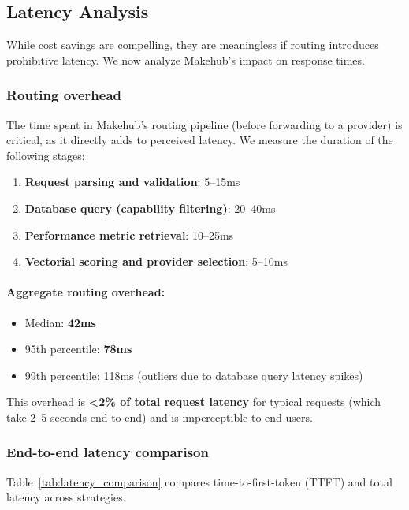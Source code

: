 \documentclass[english]{article}
\begin{document}
\subsection{Latency Analysis}

While cost savings are compelling, they are meaningless if routing introduces prohibitive latency. We now analyze Makehub's impact on response times.

\subsubsection{Routing overhead}

The time spent in Makehub's routing pipeline (before forwarding to a provider) is critical, as it directly adds to perceived latency. We measure the duration of the following stages:

\begin{enumerate}
\item \textbf{Request parsing and validation}: 5--15ms
\item \textbf{Database query (capability filtering)}: 20--40ms
\item \textbf{Performance metric retrieval}: 10--25ms
\item \textbf{Vectorial scoring and provider selection}: 5--10ms
\end{enumerate}

\paragraph{Aggregate routing overhead:}
\begin{itemize}
    \item Median: \textbf{42ms}
    \item 95th percentile: \textbf{78ms}
    \item 99th percentile: 118ms (outliers due to database query latency spikes)
\end{itemize}

This overhead is \textbf{<2\% of total request latency} for typical requests (which take 2--5 seconds end-to-end) and is imperceptible to end users.

\subsubsection{End-to-end latency comparison}

Table~\ref{tab:latency_comparison} compares time-to-first-token (TTFT) and total latency across strategies.
\end{document}
